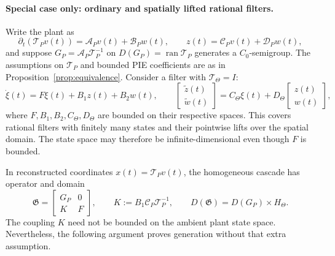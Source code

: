 \documentclass[11pt,a4paper]{article}
\DeclareMathOperator{\ran}{ran}
\begin{document}
\paragraph{Special case only: ordinary and spatially lifted rational filters.}
Write the plant as
\[
 \partial_t(\mathcal T_P v(t))
    =\mathcal A_Pv(t)+\mathcal B_Pw(t),\qquad
 z(t)=\mathcal C_Pv(t)+\mathcal D_Pw(t),
\]
and suppose $G_P=\mathcal A_P\mathcal T_P^{-1}$ on
$D(G_P)=\ran\mathcal T_P$ generates a $C_0$-semigroup.
The assumptions on $\mathcal T_P$ and bounded PIE coefficients are as
in Proposition~\ref{prop:equivalence}. Consider a filter with
$\mathcal T_\Theta=I$:
\[
 \dot\xi(t)=F\xi(t)+B_1z(t)+B_2w(t),\qquad
 \begin{bmatrix}\tilde z(t)\\\tilde w(t)\end{bmatrix}
 =C_\Theta\xi(t)+D_\Theta
                    \begin{bmatrix}z(t)\\w(t)\end{bmatrix},
\]
where $F,B_1,B_2,C_\Theta,D_\Theta$ are bounded on their respective
spaces. This covers rational filters with finitely many states and
their pointwise lifts over the spatial domain. The state space may therefore
be infinite-dimensional even though $F$ is bounded.

In reconstructed coordinates $x(t)=\mathcal T_Pv(t)$, the homogeneous
cascade has operator and domain
\begin{equation}\label{eq:cascade-generator}
 \mathfrak G=
 \begin{bmatrix}G_P&0\\K&F\end{bmatrix},\qquad
 K:=B_1\mathcal C_P\mathcal T_P^{-1},\qquad
 D(\mathfrak G)=D(G_P)\times H_\Theta.
\end{equation}
The coupling $K$ need not be bounded on the ambient plant state space.
Nevertheless, the following argument proves generation without that
extra assumption.
\end{document}
